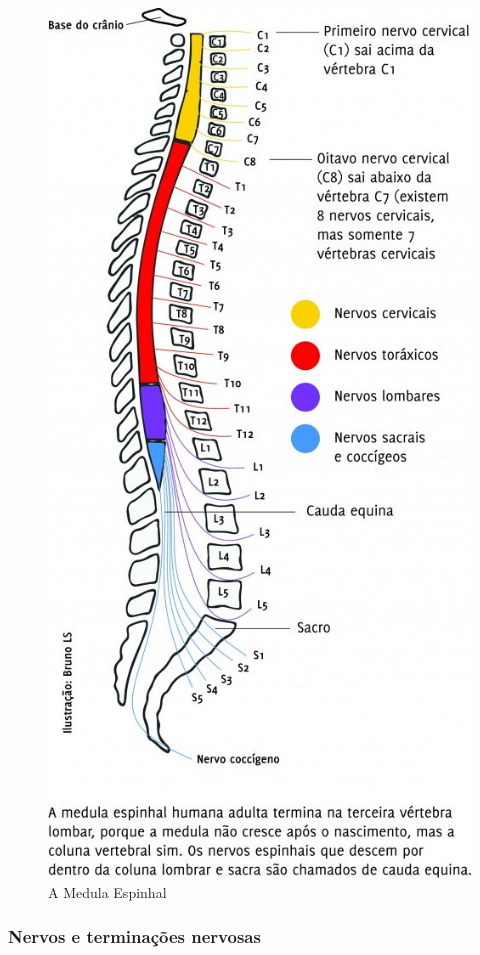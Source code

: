\documentclass[
]{book}
\begin{document}
\begin{figure}

{\centering \includegraphics[width=0.9\linewidth]{figuras/Aula6-2-medula-espinhal} 

}

\caption{A Medula Espinhal}\label{fig:unnamed-chunk-13}
\end{figure}

\hypertarget{nervos-e-terminauxe7uxf5es-nervosas}{%
\subsubsection{Nervos e terminações nervosas}\label{nervos-e-terminauxe7uxf5es-nervosas}}
\end{document}
